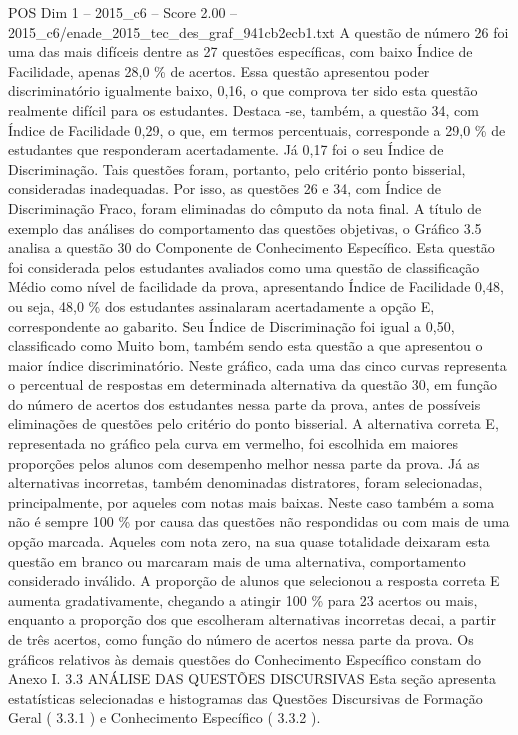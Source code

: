 \begin{textsample}{POS Dim 1 – 2015\_c6 – Score 2.00 – 2015\_c6/enade\_2015\_tec\_des\_graf\_941cb2ecb1.txt}
A questão de número 26 foi uma das mais difíceis dentre as 27 questões específicas, com baixo Índice de Facilidade, apenas 28,0 \% de acertos.
Essa questão apresentou poder discriminatório igualmente baixo, 0,16, o que comprova ter sido esta questão realmente difícil para os estudantes.
Destaca -se, também, a questão 34, com Índice de Facilidade 0,29, o que, em termos percentuais, corresponde a 29,0 \% de estudantes que responderam acertadamente.
Já 0,17 foi o seu Índice de Discriminação.
Tais questões foram, portanto, pelo critério ponto bisserial, consideradas inadequadas.
Por isso, as questões 26 e 34, com Índice de Discriminação Fraco, foram eliminadas do cômputo da nota final.
A título de exemplo das análises do comportamento das questões objetivas, o Gráfico 3.5 analisa a questão 30 do Componente de Conhecimento Específico.
Esta questão foi considerada pelos estudantes avaliados como uma questão de classificação Médio como nível de facilidade da prova, apresentando Índice de Facilidade 0,48, ou seja, 48,0 \% dos estudantes assinalaram acertadamente a opção E, correspondente ao gabarito.
Seu Índice de Discriminação foi igual a 0,50, classificado como Muito bom, também sendo esta questão a que apresentou o maior índice discriminatório.
Neste gráfico, cada uma das cinco curvas representa o percentual de respostas em determinada alternativa da questão 30, em função do número de acertos dos estudantes nessa parte da prova, antes de possíveis eliminações de questões pelo critério do ponto bisserial.
A alternativa correta E, representada no gráfico pela curva em vermelho, foi escolhida em maiores proporções pelos alunos com desempenho melhor nessa parte da prova.
Já as alternativas incorretas, também denominadas distratores, foram selecionadas, principalmente, por aqueles com notas mais baixas.
Neste caso também a soma não é sempre 100 \% por causa das questões não respondidas ou com mais de uma opção marcada.
Aqueles com nota zero, na sua quase totalidade deixaram esta questão em branco ou marcaram mais de uma alternativa, comportamento considerado inválido.
A proporção de alunos que selecionou a resposta correta E aumenta gradativamente, chegando a atingir 100 \% para 23 acertos ou mais, enquanto a proporção dos que escolheram alternativas incorretas decai, a partir de três acertos, como função do número de acertos nessa parte da prova.
Os gráficos relativos às demais questões do Conhecimento Específico constam do Anexo I. 3.3 ANÁLISE DAS QUESTÕES DISCURSIVAS Esta seção apresenta estatísticas selecionadas e histogramas das Questões Discursivas de Formação Geral ( 3.3.1 ) e Conhecimento Específico ( 3.3.2 ).

\end{textsample}
